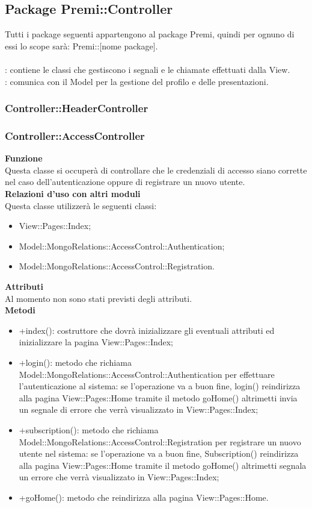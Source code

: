 \subsection{Package Premi::Controller}{
		\label{sec:controller}
		Tutti i package seguenti appartengono al package Premi, quindi per ognuno di essi lo scope sarà: Premi::[nome package].\\\\
		\textbf{\tipo}: contiene le classi che gestiscono i segnali e le chiamate effettuati dalla View.\\
		\textbf{\relaz}: comunica con il Model per la gestione del profilo e delle presentazioni.\\
		\subsubsection{Controller::HeaderController}
		
		\subsubsection{Controller::AccessController}{
				\label{sub:indexcontroller}
				\textbf{Funzione}\\
					\indent Questa classe si occuperà di controllare che le credenziali di accesso siano corrette nel caso dell'autenticazione oppure di registrare un nuovo utente.\\
				\textbf{Relazioni d'uso con altri moduli}\\
					\indent Questa classe utilizzerà le seguenti classi:
				\begin{itemize}
					\item View::Pages::Index;
					\item Model::MongoRelations::AccessControl::Authentication;
					\item Model::MongoRelations::AccessControl::Registration.
				\end{itemize}
				\textbf{Attributi}\\
					\indent Al momento non sono stati previsti degli attributi.\\
				\textbf{Metodi}
					\begin{itemize}
					\item +index(): costruttore che dovrà inizializzare gli eventuali attributi ed inizializzare la pagina View::Pages::Index;
					\item +login(): metodo che richiama Model::MongoRelations::AccessControl::Authentication per effettuare l'autenticazione al sistema: se l'operazione va a buon fine, login() reindirizza alla pagina View::Pages::Home tramite il metodo goHome() altrimetti invia un segnale di errore che verrà visualizzato in View::Pages::Index;
					\item +subscription(): metodo che richiama Model::MongoRelations::AccessControl::Registration per registrare un nuovo utente nel sistema: se l'operazione va a buon fine, Subscription() reindirizza alla pagina View::Pages::Home tramite il metodo goHome() altrimetti segnala un errore che verrà visualizzato in View::Pages::Index;
					\item +goHome(): metodo che reindirizza alla pagina View::Pages::Home.
				\end{itemize}
			}
}
